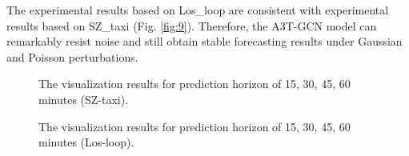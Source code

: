 \documentclass[10pt,journal,compsoc]{IEEEtran}
\begin{document}
\par The experimental results based on Los\_loop  are consistent with experimental results based on SZ\_taxi (Fig. \ref{fig:9}). Therefore, the A3T-GCN model can remarkably resist noise and still obtain stable forecasting results under Gaussian and Poisson perturbations.




\begin{figure}
\centering
{}

\caption{The visualization results for prediction horizon of 15, 30, 45, 60 minutes (SZ-taxi).}
\label{fig:10}
\end{figure}

\begin{figure}
\centering
{}

\caption{The visualization results for prediction horizon of 15, 30, 45, 60 minutes (Los-loop).}
\label{fig:11}
\end{figure}
\end{document}
